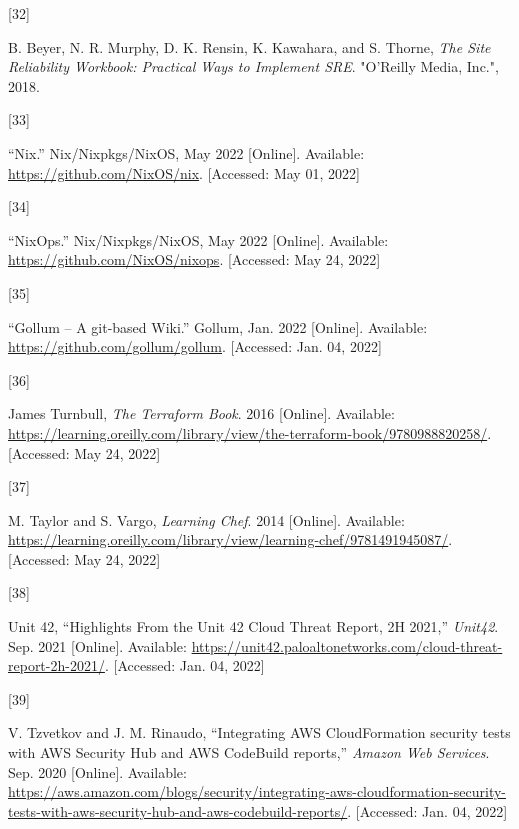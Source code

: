 \documentclass[
  a4paper,
  bibtex,
  english,
  nomenclature]{kthlatex/kththesis/kththesis}
\newlength{\cslhangindent}
\newlength{\csllabelwidth}
\newlength{\cslentryspacingunit} %
\newenvironment{CSLReferences}[2] %
 {%
  \setlength{\parindent}{0pt}
  \ifodd #1
  \let\oldpar\par
  \def\par{\hangindent=\cslhangindent\oldpar}
  \fi
  \setlength{\parskip}{#2\cslentryspacingunit}
 }%
 {}
\newcommand{\CSLLeftMargin}[1]{\parbox[t]{\csllabelwidth}{#1}}
\newcommand{\CSLRightInline}[1]{\parbox[t]{\linewidth - \csllabelwidth}{#1}\break}
\begin{document}
\begin{CSLReferences}{0}{0}
\leavevmode{}%
\CSLLeftMargin{{[}32{]} }
\CSLRightInline{B. Beyer, N. R. Murphy, D. K. Rensin, K. Kawahara, and
S. Thorne, \emph{The {Site Reliability Workbook}: {Practical Ways} to
{Implement SRE}}. {"O'Reilly Media, Inc."}, 2018. }

\leavevmode{}%
\CSLLeftMargin{{[}33{]} }
\CSLRightInline{{``Nix.''} Nix/Nixpkgs/NixOS, May 2022 {[}Online{]}.
Available: \url{https://github.com/NixOS/nix}. {[}Accessed: May 01,
2022{]}}

\leavevmode{}%
\CSLLeftMargin{{[}34{]} }
\CSLRightInline{{``{NixOps}.''} Nix/Nixpkgs/NixOS, May 2022
{[}Online{]}. Available: \url{https://github.com/NixOS/nixops}.
{[}Accessed: May 24, 2022{]}}

\leavevmode{}%
\CSLLeftMargin{{[}35{]} }
\CSLRightInline{{``Gollum -- {A} git-based {Wiki}.''} Gollum, Jan. 2022
{[}Online{]}. Available: \url{https://github.com/gollum/gollum}.
{[}Accessed: Jan. 04, 2022{]}}

\leavevmode{}%
\CSLLeftMargin{{[}36{]} }
\CSLRightInline{James Turnbull, \emph{The {Terraform Book}}. 2016
{[}Online{]}. Available:
\url{https://learning.oreilly.com/library/view/the-terraform-book/9780988820258/}.
{[}Accessed: May 24, 2022{]}}

\leavevmode{}%
\CSLLeftMargin{{[}37{]} }
\CSLRightInline{M. Taylor and S. Vargo, \emph{Learning {Chef}}. 2014
{[}Online{]}. Available:
\url{https://learning.oreilly.com/library/view/learning-chef/9781491945087/}.
{[}Accessed: May 24, 2022{]}}

\leavevmode{}%
\CSLLeftMargin{{[}38{]} }
\CSLRightInline{Unit 42, {``Highlights {From} the {Unit} 42 {Cloud
Threat Report}, {2H} 2021,''} \emph{Unit42}. Sep. 2021 {[}Online{]}.
Available:
\url{https://unit42.paloaltonetworks.com/cloud-threat-report-2h-2021/}.
{[}Accessed: Jan. 04, 2022{]}}

\leavevmode{}%
\CSLLeftMargin{{[}39{]} }
\CSLRightInline{V. Tzvetkov and J. M. Rinaudo, {``Integrating {AWS
CloudFormation} security tests with {AWS Security Hub} and {AWS
CodeBuild} reports,''} \emph{Amazon Web Services}. Sep. 2020
{[}Online{]}. Available:
\url{https://aws.amazon.com/blogs/security/integrating-aws-cloudformation-security-tests-with-aws-security-hub-and-aws-codebuild-reports/}.
{[}Accessed: Jan. 04, 2022{]}}


\end{CSLReferences}
\end{document}
